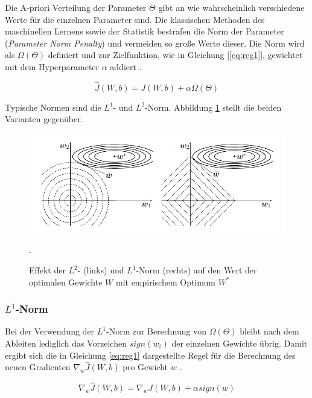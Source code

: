 Die A-priori Verteilung der Parameter $\Theta$ gibt an wie wahrscheinlich verschiedene Werte für die einzelnen Parameter sind. Die klassischen Methoden des maschinellen Lernens sowie der Statistik bestrafen die Norm der Parameter (\textit{Parameter Norm Penalty}) und vermeiden so große Werte dieser. Die Norm wird als $\Omega(\Theta)$ definiert und zur Zielfunktion, wie in Gleichung \ref{[eq:reg1]}, gewichtet mit dem Hyperparameter $\alpha$ addiert \cite[vgl.][Kap. 7.2, S. 200]{Bengio2015}. 

\begin{equation}
\label{[eq:reg1]}
\hat{J}(W,b) =  J(W,b) + \alpha \Omega(\Theta)
\end{equation}

Typische Normen sind die $L^1$- und $L^2$-Norm. Abbildung \ref{fig:4_regularizer} stellt die beiden Varianten gegenüber.

\begin{figure}
\centering
\includegraphics[width=0.8\linewidth]{images/4_regularizer}
\caption[]{Effekt der $L^2$- (links) und $L^1$-Norm (rechts) auf den Wert der optimalen Gewichte $W$ mit empirischem Optimum $W^*$ \cite[vgl.][Kap. 7.2, S. 199]{Bengio2015}}.
\label{fig:4_regularizer}
\end{figure}


\subsubsection{$L^1$-Norm}

Bei der Verwendung der $L^1$-Norm zur Berechnung von $\Omega(\Theta)$ bleibt nach dem Ableiten lediglich das Vorzeichen $sign(w_i)$ der einzelnen Gewichte übrig. Damit ergibt sich die in Gleichung \ref{eq:reg1} dargestellte Regel für die Berechnung des neuen Gradienten $\nabla_w \hat{J}(W,b)$ pro Gewicht $w$ \cite[vgl.][Kap. 7.2, S. 203 f.]{Bengio2015}. 

\begin{equation}
\label{eq:reg1}
\nabla_w \hat{J}(W,b) = \nabla_w J(W,b) + \alpha sign(w)
\end{equation}

